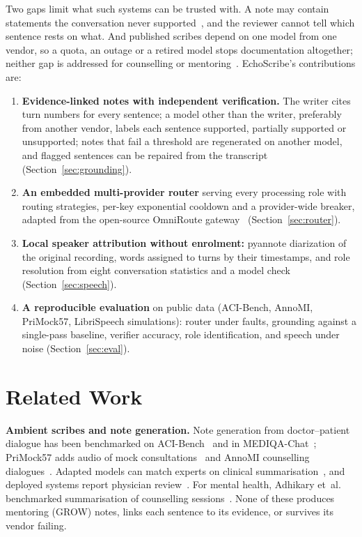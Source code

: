 \documentclass[conference]{IEEEtran}
\begin{document}
Two gaps limit what such systems can be trusted with. A note may contain statements the conversation never supported~\cite{ji2023survey,asgari2025}, and the reviewer cannot tell which sentence rests on what. And published scribes depend on one model from one vendor, so a quota, an outage or a retired model stops documentation altogether; neither gap is addressed for counselling or mentoring~\cite{wang2025scribe,xu2025laos,yim2023aci}. EchoScribe's contributions are:
\begin{enumerate}
\item \textbf{Evidence-linked notes with independent verification.} The writer cites turn numbers for every sentence; a model other than the writer, preferably from another vendor, labels each sentence supported, partially supported or unsupported; notes that fail a threshold are regenerated on another model, and flagged sentences can be repaired from the transcript (Section~\ref{sec:grounding}).
\item \textbf{An embedded multi-provider router} serving every processing role with routing strategies, per-key exponential cooldown and a provider-wide breaker, adapted from the open-source OmniRoute gateway~\cite{omniroute2026} (Section~\ref{sec:router}).
\item \textbf{Local speaker attribution without enrolment:} pyannote diarization of the original recording, words assigned to turns by their timestamps, and role resolution from eight conversation statistics and a model check (Section~\ref{sec:speech}).
\item \textbf{A reproducible evaluation} on public data (ACI-Bench, AnnoMI, PriMock57, LibriSpeech simulations): router under faults, grounding against a single-pass baseline, verifier accuracy, role identification, and speech under noise (Section~\ref{sec:eval}).
\end{enumerate}

\section{Related Work}
\textbf{Ambient scribes and note generation.} Note generation from doctor--patient dialogue has been benchmarked on ACI-Bench~\cite{yim2023aci} and in MEDIQA-Chat~\cite{benabacha2023mediqa}; PriMock57 adds audio of mock consultations~\cite{korfiatis2022primock57} and AnnoMI counselling dialogues~\cite{wu2022annomi}. Adapted models can match experts on clinical summarisation~\cite{vanveen2024,wang2025acl}, and deployed systems report physician review~\cite{xu2025laos,wang2025scribe}. For mental health, Adhikary et~al. benchmarked summarisation of counselling sessions~\cite{adhikary2024}. None of these produces mentoring (GROW) notes, links each sentence to its evidence, or survives its vendor failing.
\end{document}
